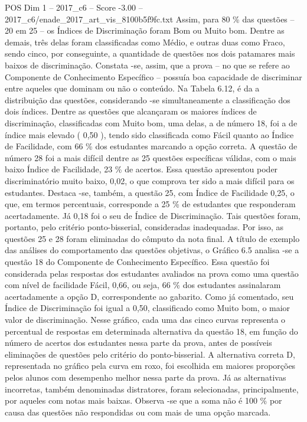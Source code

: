 \begin{textsample}{POS Dim 1 – 2017\_c6 – Score -3.00 – 2017\_c6/enade\_2017\_art\_vis\_8100b5f9fc.txt}
Assim, para 80 \% das questões – 20 em 25 – os Índices de Discriminação foram Bom ou Muito bom.
Dentre as demais, três delas foram classificadas como Médio, e outras duas como Fraco, sendo cinco, por conseguinte, a quantidade de questões nos dois patamares mais baixos de discriminação.
Constata -se, assim, que a prova – no que se refere ao Componente de Conhecimento Específico – possuía boa capacidade de discriminar entre aqueles que dominam ou não o conteúdo.
Na Tabela 6.12, é da a distribuição das questões, considerando -se simultaneamente a classificação dos dois índices.
Dentre as questões que alcançaram os maiores índices de discriminação, classificadas com Muito bom, uma delas, a de número 18, foi a de índice mais elevado ( 0,50 ), tendo sido classificada como Fácil quanto ao Índice de Facilidade, com 66 \% dos estudantes marcando a opção correta.
A questão de número 28 foi a mais difícil dentre as 25 questões específicas válidas, com o mais baixo Índice de Facilidade, 23 \% de acertos.
Essa questão apresentou poder discriminatório muito baixo, 0,02, o que comprova ter sido a mais difícil para os estudantes.
Destaca -se, também, a questão 25, com Índice de Facilidade 0,25, o que, em termos percentuais, corresponde a 25 \% de estudantes que responderam acertadamente.
Já 0,18 foi o seu de Índice de Discriminação.
Tais questões foram, portanto, pelo critério ponto-bisserial, consideradas inadequadas.
Por isso, as questões 25 e 28 foram eliminadas do cômputo da nota final.
A título de exemplo das análises do comportamento das questões objetivas, o Gráfico 6.5 analisa -se a questão 18 do Componente de Conhecimento Específico.
Essa questão foi considerada pelas respostas dos estudantes avaliados na prova como uma questão com nível de facilidade Fácil, 0,66, ou seja, 66 \% dos estudantes assinalaram acertadamente a opção D, correspondente ao gabarito.
Como já comentado, seu Índice de Discriminação foi igual a 0,50, classificado como Muito bom, o maior valor de discriminação.
Nesse gráfico, cada uma das cinco curvas representa o percentual de respostas em determinada alternativa da questão 18, em função do número de acertos dos estudantes nessa parte da prova, antes de possíveis eliminações de questões pelo critério do ponto-bisserial.
A alternativa correta D, representada no gráfico pela curva em roxo, foi escolhida em maiores proporções pelos alunos com desempenho melhor nessa parte da prova.
Já as alternativas incorretas, também denominadas distratores, foram selecionadas, principalmente, por aqueles com notas mais baixas.
Observa -se que a soma não é 100 \% por causa das questões não respondidas ou com mais de uma opção marcada.

\end{textsample}
